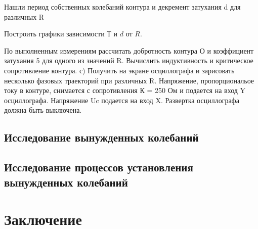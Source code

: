 Нашли период собственных колебаний контура и декремент затухания d для различных R

Построить графики зависимости $Т$ и $d$ от $R$.

 По выполненным измерениям рассчитать добротность контура О и коэффициент затухания 5 для одного из значений R. Вычислить индуктивность и критическое сопротивление контура.
с) Получить на экране осциллографа и зарисовать несколько фазовых траекторий при различных R. Напряжение, пропорциональое току в контуре, снимается с сопротивления К = 250 Ом и подается на вход Y осциллографа. Напряжение Uc подается на вход X. Развертка осциллографа должна быть выключена.
\subsection{Исследование вынужденных колебаний}
\subsection{Исследование процессов установления вынужденных колебаний}
\section{Заключение}

 